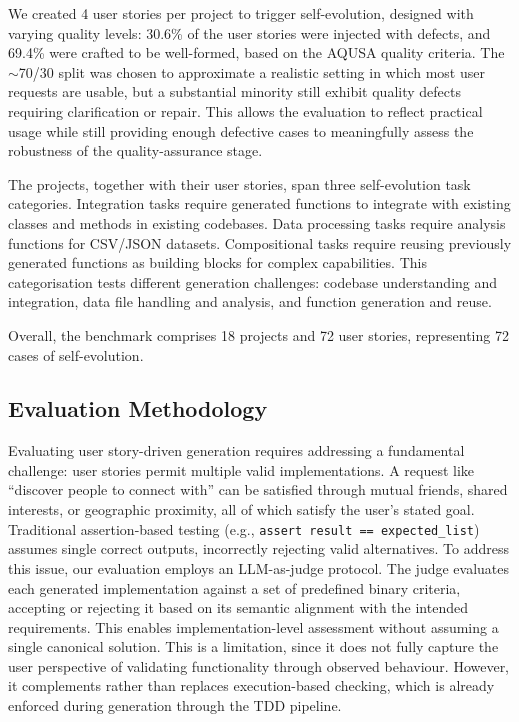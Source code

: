 \documentclass[sigconf,screen]{acmart}
\begin{document}
We created 4 user stories per project to trigger self-evolution, designed with varying quality levels: 30.6\% of the user stories were injected with defects, and 69.4\% were crafted to be well-formed, based on the AQUSA quality criteria. The $\sim$70/30 split was chosen to approximate a realistic setting in which most user requests are usable, but a substantial minority still exhibit quality defects requiring clarification or repair. This allows the evaluation to reflect practical usage while still providing enough defective cases to meaningfully assess the robustness of the quality-assurance stage.

The projects, together with their user stories, span three self-evolution task categories. Integration tasks require generated functions to integrate with existing classes and methods in existing codebases. Data processing tasks require analysis functions for CSV/JSON datasets. Compositional tasks require reusing previously generated functions as building blocks for complex capabilities. This categorisation tests different generation challenges: codebase understanding and integration, data file handling and analysis, and function generation and reuse.

Overall, the benchmark comprises 18 projects and 72 user stories, representing 72 cases of self-evolution.

\subsection{Evaluation Methodology}

Evaluating user story-driven generation requires addressing a fundamental challenge: user stories permit multiple valid implementations. A request like ``discover people to connect with'' can be satisfied through mutual friends, shared interests, or geographic proximity, all of which satisfy the user's stated goal. Traditional assertion-based testing (e.g., \texttt{assert result == expected\_list}) assumes single correct outputs, incorrectly rejecting valid alternatives.
To address this issue, our evaluation employs an LLM-as-judge protocol. The judge evaluates each generated implementation against a set of predefined binary criteria, accepting or rejecting it based on its semantic alignment with the intended requirements. This enables implementation-level assessment without assuming a single canonical solution.
This is a limitation, since it does not fully capture the user perspective of validating functionality through observed behaviour. However, it complements rather than replaces execution-based checking, which is already enforced during generation through the TDD  pipeline.
\end{document}
